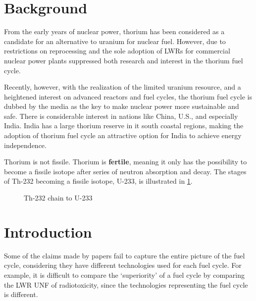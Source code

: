 \documentclass{article}
\begin{document}
\section{Background}
From the early years of nuclear power, thorium has been
considered as a candidate for an alternative to uranium
for nuclear fuel. However, due to restrictions on reprocessing
and the sole adoption of \glspl{LWR} for commercial nuclear
power plants suppressed both research and interest in the 
thorium fuel cycle. 

Recently, however, with the realization of the limited
uranium resource, and a heightened interest on advanced
reactors and fuel cycles, the thorium fuel cycle is
dubbed by the media as the key to make nuclear power
more sustainable and safe. There is considerable interest
in nations like China, U.S., and especially India.
India has a large thorium reserve in it south coastal regions,
making the adoption of thorium fuel cycle an attractive option
for India to achieve energy independence.

Thorium is not fissile. Thorium is \textbf{fertile}, meaning
it only has the possibility to become a fissile isotope after
series of neutron absorption and decay. The stages of Th-232
becoming a fissile isotope, U-233, is illustrated in \cref{diag:th_chain}. 

\begin{figure}[h]
\caption{Th-232 chain to U-233}
\label{diag:th_chain}
\end{figure}


\section{Introduction}


Some of the claims made by papers fail to capture
the entire picture of the fuel cycle, considering they have different
technologies used for each fuel cycle. For example, it is difficult
to compare the `superiority' of a fuel cycle by comparing the 
\gls{LWR} \gls{UNF} of radiotoxicity, since the technologies
representing the fuel cycle is different.
\end{document}
